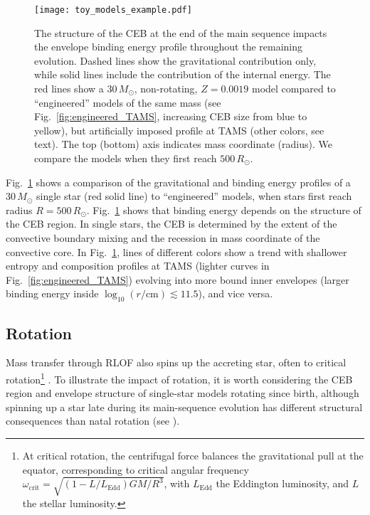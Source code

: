 \documentclass[twocolumn,twocolappendix,trackchanges]{aastex63}
\DeclareRobustCommand{\Figref}[1]{Fig.~\ref{#1}}
\begin{document}
\begin{figure}[htbp]
  \centering
  \texttt{[image: toy\_models\_example.pdf]}
  \caption{The structure of the CEB at the end of the main sequence
    impacts the envelope binding energy profile throughout the
    remaining evolution. Dashed lines show the gravitational
    contribution only, while solid lines include the contribution of
    the internal energy. The red lines show a $30\,M_\odot$,
    non-rotating, $Z=0.0019$ model compared to ``engineered'' models
    of the same mass (see \Figref{fig:engineered_TAMS},
    increasing CEB size from blue to yellow), but
    artificially imposed profile at TAMS (other colors, see text). The
    top (bottom) axis indicates mass coordinate (radius). We compare
    the models when they first reach $500\,R_\odot$.}
  \label{fig:toy_models_example}
\end{figure}


\Figref{fig:toy_models_example} shows a comparison of the
gravitational and binding energy profiles of a $30\,M_\odot$ single
star (red solid line) to
``engineered'' models, when stars first
reach radius $R=500\,R_\odot$.
\Figref{fig:toy_models_example} shows that
binding energy depends on the structure of the CEB region. In single
stars, the CEB is determined by the extent of the convective boundary
mixing and the recession in mass coordinate of the
convective core. In \Figref{fig:toy_models_example}, lines of
different colors show a trend with shallower entropy and composition
profiles at TAMS (lighter curves in \Figref{fig:engineered_TAMS})
evolving into more bound inner envelopes (larger
binding energy inside $\log_{10}(r/\mathrm{cm})\lesssim 11.5$), and
vice versa.

\subsection{Rotation}
\label{sec:rot_examples}

Mass transfer through RLOF also spins up the accreting star, often to
critical rotation\footnote{At critical rotation, the centrifugal force
  balances the gravitational pull at the equator, corresponding to
  critical angular frequency
  $\omega_\mathrm{crit}=\sqrt{(1-L/L_\mathrm{Edd})GM/R^3}$, with
  $L_\mathrm{Edd}$ the Eddington luminosity, and $L$ the stellar
  luminosity.} \citep[e.g.,][]{lubow:1975, packet:1981,
  cantiello:2007, renzo:2021zoph}. To illustrate the
  impact of rotation, it is worth considering the CEB
 region and envelope structure
 of single-star models rotating since
birth, although spinning up a star late during its
main-sequence evolution has different structural consequences than
natal rotation (see \citealt{renzo:2021zoph}).
\end{document}
